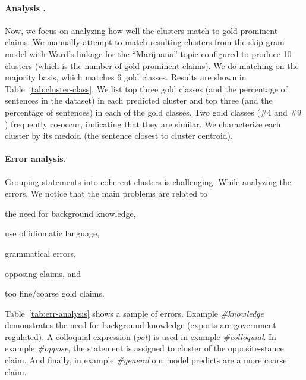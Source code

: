 \paragraph{Analysis .} 
Now, we focus on analyzing how well the clusters match to gold 
prominent claims. 
We manually attempt to match resulting clusters from 
the skip-gram model with Ward's linkage for the ``Marijuana'' topic configured
to produce 10 clusters (which is the number of gold prominent claims). 
We do matching on the majority basis, which matches 6 gold classes. 
Results are shown in Table~\ref{tab:cluster-class}. 
We list top three gold classes (and the percentage of sentences in the dataset) 
in each predicted cluster and top three
(and the percentage of sentences) in each of the gold classes. 
Two gold classes  ($\#4$ and $\#9$) frequently co-occur, indicating 
that they are similar. 
We characterize each cluster by its medoid (the sentence closest to cluster centroid).

\paragraph{Error analysis.}
Grouping statements into coherent clusters is challenging. 
While analyzing the errors, We notice that the main problems are related to 
\begin{enumerate*}[label=(\arabic*)]
\item the need for background knowledge, 
\item use of idiomatic language, 
\item grammatical errors, 
\item opposing claims, and 
\item too fine/coarse gold claims.
\end{enumerate*}
Table~\ref{tab:err-analysis} shows a sample of errors. 
Example \emph{\#knowledge} demonstrates the need for background knowledge 
(exports are government regulated). 
A colloquial expression (\emph{pot}) is used in example \emph{\#colloquial}. 
In example \emph{\#oppose}, the statement is assigned to cluster of the opposite-stance
claim. 
And finally, in example \emph{\#general} our model predicts are a more coarse claim. 

